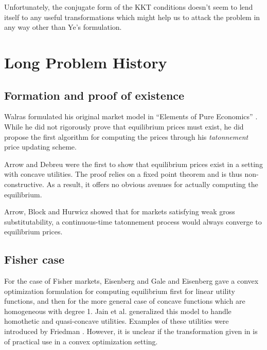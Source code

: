 \documentclass[12pt]{article}
\begin{document}
Unfortunately, the conjugate form of the KKT conditions doesn't seem to lend
itself to any useful transformations which might help us to attack the problem
in any way other than Ye's formulation.

\section{Long Problem History}
\subsection{Formation and proof of existence}
Walras formulated his original market model in ``Elements of Pure Economics''
\cite{walras1896elements}. While he did not rigorously prove that equilibrium
prices must exist, he did propose the first algorithm for computing the prices
through his \emph{tatonnement} price updating scheme.

Arrow and Debreu \cite{arrow1954existence} were the first to show that
equilibrium prices exist in a setting with concave utilities.
The proof relies on a fixed point theorem and is thus non-constructive.
As a result, it offers no obvious avenues for actually computing the
equilibrium.

Arrow, Block and Hurwicz \cite{arrow1959stability} showed that for markets
satisfying weak gross substitutability, a continuous-time tatonnement process
would always converge to equilibrium prices.


\subsection{Fisher case}
For the case of Fisher markets,
Eisenberg and Gale \cite{eisenberg1959consensus, gale1960theory} and
Eisenberg \cite{eisenberg1961aggregation} gave a convex optimization
formulation for computing equilibrium first for linear utility functions,
and then for the more general case of concave functions which are homogeneous
with degree 1.
Jain et al. \cite{jain2005market} generalized this model to handle homothetic
and quasi-concave utilities.
Examples of these utilities were introduced by Friedman
\cite{friedman1973concavity}.
However, it is unclear if the transformation given in
\cite{jain2005market} is of practical use in a convex optimization setting.
\end{document}
